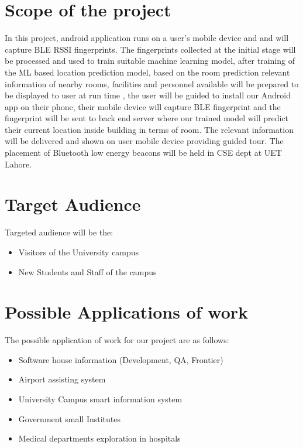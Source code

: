 \section{Scope of the project}
In this project, android application runs on a user’s mobile device and and will capture BLE RSSI fingerprints. The fingerprints collected at the initial stage will be processed and used to train suitable machine learning model, after training of the ML based location prediction model, based on the room prediction relevant information of nearby rooms, facilities and personnel available will be prepared to be displayed to user at run time , the user will be guided to install our Android app on their phone, their mobile device will capture BLE fingerprint and the fingerprint will be sent to back end server where our trained model will predict their current location inside building in terms of room\cite{Loco}. The relevant information will be delivered and shown on user mobile device providing guided tour. 
The placement of Bluetooth low energy beacons will be held in CSE dept at UET Lahore. 


\section{Target Audience}
Targeted audience will be the:
\begin{itemize}
\item Visitors of the University campus 
\item New Students and Staff of the campus
\end{itemize}



\section{Possible Applications of work}
The possible application of work for our project are as follows:


\begin{itemize}
\item Software house information (Development, QA, Frontier)
\item Airport assisting system
\item University Campus smart information system
\item Government small Institutes
\item Medical departments exploration in hospitals
\end{itemize}


\begin{table}[h]
\centering
\begin{tabular}{l|l} \hline
\end{tabular}
\label{tab:logic_flow}
\end{table}




